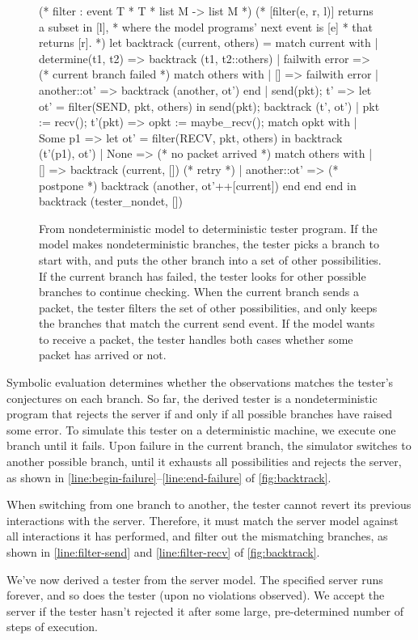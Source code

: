 \begin{figure}
  \begin{coq}[escapechar=\%]
(* filter : event T * T * list M -> list M *)
(* [filter(e, r, l)] returns a subset in [l],
 * where the model programs' next event is [e]
 * that returns [r]. *)
let backtrack (current, others) =
  match current with
  | determine(t1, t2) =>
    backtrack (t1, t2::others)
  | failwith error => (* current branch failed *) %
    match others with
    | [] => failwith error
    | another::ot' => backtrack (another, ot')
    end %
  | send(pkt); t' =>
    let ot' = filter(SEND, pkt, others) in %
    send(pkt); backtrack (t', ot')
  | pkt := recv(); t'(pkt) =>
    opkt := maybe_recv();
    match opkt with
    | Some p1 =>
      let ot' = filter(RECV, pkt, others) in %
      backtrack (t'(p1), ot')
    | None =>             (* no packet arrived *)
      match others with
      | [] => backtrack (current, []) (* retry *)
      | another::ot' =>            (* postpone *)
        backtrack (another, ot'++[current])
      end
    end
  end in
backtrack (tester_nondet, [])
  \end{coq}
  \caption{From nondeterministic model to deterministic tester program.  If the
    model makes nondeterministic branches, the tester picks a branch to start
    with, and puts the other branch into a set of other possibilities.  If the
    current branch has failed, the tester looks for other possible branches to
    continue checking.  When the current branch sends a packet, the tester
    filters the set of other possibilities, and only keeps the branches that
    match the current send event.  If the model wants to receive a packet, the
    tester handles both cases whether some packet has arrived or not.}
  \label{fig:backtrack}
\end{figure}

Symbolic evaluation determines whether the observations matches the tester's
conjectures on each branch.  So far, the derived tester
is a nondeterministic program that rejects the server if and only if all
possible branches have raised some error.  To simulate this tester on a
deterministic machine, we execute one branch until it fails.  Upon failure in
the current branch, the simulator switches to another possible branch, until it
exhausts all possibilities and rejects the server, as shown in
\autoref{line:begin-failure}--\ref{line:end-failure} of
\autoref{fig:backtrack}.

When switching from one branch to another, the tester cannot revert its previous
interactions with the server.  Therefore, it must match the server model against
all interactions it has performed, and filter out the mismatching branches, as
shown in \autoref{line:filter-send} and \autoref{line:filter-recv} of
\autoref{fig:backtrack}.

We've now derived a tester from the server model.  The specified server runs
forever, and so does the tester (upon no violations observed).  We accept the
server if the tester hasn't rejected it after some large, pre-determined number
of steps of execution.
